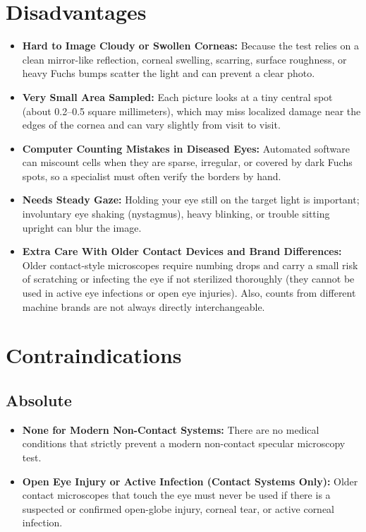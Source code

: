 \section{Disadvantages}

\begin{itemize}
    \item \textbf{Hard to Image Cloudy or Swollen Corneas:} Because the test relies on a clean mirror-like reflection, corneal swelling, scarring, surface roughness, or heavy Fuchs bumps scatter the light and can prevent a clear photo.
    \item \textbf{Very Small Area Sampled:} Each picture looks at a tiny central spot (about 0.2--0.5 square millimeters), which may miss localized damage near the edges of the cornea and can vary slightly from visit to visit.
    \item \textbf{Computer Counting Mistakes in Diseased Eyes:} Automated software can miscount cells when they are sparse, irregular, or covered by dark Fuchs spots, so a specialist must often verify the borders by hand.
    \item \textbf{Needs Steady Gaze:} Holding your eye still on the target light is important; involuntary eye shaking (nystagmus), heavy blinking, or trouble sitting upright can blur the image.
    \item \textbf{Extra Care With Older Contact Devices and Brand Differences:} Older contact-style microscopes require numbing drops and carry a small risk of scratching or infecting the eye if not sterilized thoroughly (they cannot be used in active eye infections or open eye injuries). Also, counts from different machine brands are not always directly interchangeable.
\end{itemize}

\section{Contraindications}

\subsection{Absolute}

\begin{itemize}
    \item \textbf{None for Modern Non-Contact Systems:} There are no medical conditions that strictly prevent a modern non-contact specular microscopy test.
    \item \textbf{Open Eye Injury or Active Infection (Contact Systems Only):} Older contact microscopes that touch the eye must never be used if there is a suspected or confirmed open-globe injury, corneal tear, or active corneal infection.
\end{itemize}

